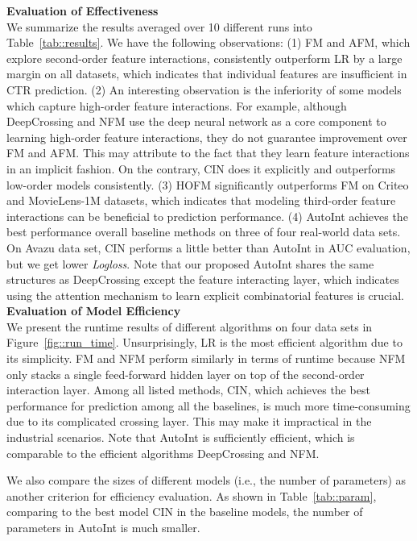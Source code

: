 \noindent\textbf{Evaluation of Effectiveness}\\
We summarize the results averaged over 10 different runs into Table~\ref{tab::results}.
We have the following observations: 
(1) FM and AFM, which explore second-order feature interactions, consistently outperform LR by a large margin on all datasets, which indicates that individual features are insufficient in CTR prediction.
(2) An interesting observation is the inferiority of some models which capture high-order feature interactions. For example, although DeepCrossing and NFM use the deep neural network as a core component to learning high-order feature interactions, they do not guarantee improvement over FM and AFM. This may attribute to the fact that they learn feature interactions in an implicit fashion. On the contrary, CIN does it explicitly and outperforms low-order models consistently.
(3) HOFM significantly outperforms FM on Criteo and MovieLens-1M datasets, which indicates that modeling third-order feature interactions can be beneficial to prediction performance.
(4) AutoInt achieves the best performance overall baseline methods on three of four real-world data sets. On Avazu data set, CIN performs a little better than AutoInt in AUC evaluation, but we get lower \textit{Logloss}. Note that our proposed AutoInt shares the same structures as DeepCrossing except the feature interacting layer, which indicates using the attention mechanism to learn explicit combinatorial features is crucial. \\




\noindent\textbf{Evaluation of Model Efficiency}\\
We present the runtime results of different algorithms on four data sets in Figure~\ref{fig::run_time}. Unsurprisingly, LR is the most efficient algorithm due to its simplicity. FM and NFM perform similarly in terms of runtime because NFM only stacks a single feed-forward hidden layer on top of the second-order interaction layer. Among all listed methods, CIN, which achieves the best performance for prediction among all the baselines, is much more time-consuming due to its complicated crossing layer. This may make it impractical in the industrial scenarios. Note that AutoInt is sufficiently efficient, which is comparable to the efficient algorithms DeepCrossing and NFM.

We also compare the sizes of different models (i.e., the number of parameters) as another criterion for efficiency evaluation. As shown in Table~\ref{tab::param}, comparing to the best model CIN in the baseline models, the number of parameters in AutoInt is much smaller. 



